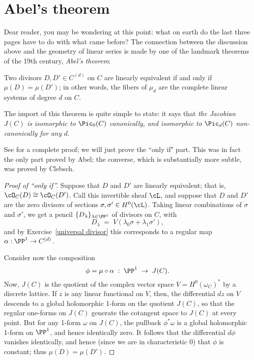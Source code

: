 \section{Abel's theorem}

Dear reader, you may be wondering at this point: what on earth do the last three pages have to do with what came before? The connection between the discussion above and the geometry of linear series is made by one of the landmark theorems of the 19th century, \emph{Abel's theorem}:

\begin{theorem}
Two divisors $D, D' \in C^{(d)}$ on $C$ are linearly equivalent if and only if $\mu(D) = \mu(D')$; in other words, the fibers of $\mu_d$ are the complete linear systems of degree $d$ on $C$.
\end{theorem}

The import of this theorem is quite simple to state: it says that \emph{the Jacobian $J(C)$ is isomorphic to $\Pic_0(C)$ canonically, and isomorphic to $\Pic_d(C)$ non-canonically for any $d$}.

See \cite[Section 2.2]{Griffiths-Harris1978}  for a complete proof; we will just prove the ``only if" part. This was in fact the only part proved by Abel; the converse, which is substantially more subtle, was proved by Clebsch.

\begin{proof}[Proof of ``only if'']
Suppose that $D$ and $D'$ are linearly equivalent; that is, $\cO_C(D) \cong \cO_C(D')$. Call this invertible sheaf $\cL$, and suppose that $D$ and $D'$ are the zero divisors of sections $\sigma, \sigma' \in H^0(\cL)$.
Taking linear combinations of $\sigma$ and $\sigma'$, we get a pencil $\{D_\lambda\}_{\lambda \in \PP^1}$ of divisors on $C$, with
$$
D_\lambda \; = \; V(\lambda_0\sigma + \lambda_1\sigma'),
$$
and by Exercise~\ref{universal divisor} this corresponds to a regular map $\alpha : \PP^1 \to C^{(d)}$. 

Consider now the composition
$$
\phi = \mu \circ \alpha \; : \; \PP^1 \; \to \; J(C).
$$
Now, $J(C)$ is the quotient of the complex vector space $V = H^0(\omega_C)^*$ by a discrete lattice. If $z$ is any linear functional on $V$, then, the differential $dz$  on $V$ descends to a global holomorphic 1-form on the quotient $J(C)$, so that the regular one-forms on $J(C)$ generate the cotangent space to $J(C)$ at every point. But for any 1-form $\omega$ on $J(C)$, the pullback $\phi^*\omega$ is a global holomorphic 1-form on $\PP^1$, and hence identically zero. It follows that the differential $d\phi$ vanishes identically, and hence (since we are in characteristic 0) that $\phi$ is constant; thus $\mu(D) = \mu(D')$.
\end{proof}

